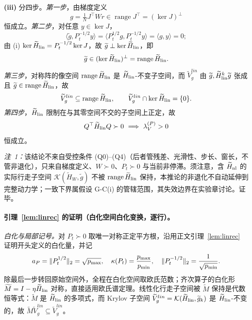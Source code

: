 \documentclass[fontset=windows,11pt]{ctexart}
\DeclarePairedDelimiter{\norm}{\lVert}{\rVert}
\newcommand{\W}{W}
\newcommand{\wt}[1]{\widetilde{#1}}
\numberwithin{equation}{section}
\begin{document}
\noindent\textbf{(iii)} 分四步。\emph{第一步}，由梯度定义
\begin{equation}
g=\tfrac1N J^\top\W r\in\operatorname{range}J^\top=(\ker J)^\perp
\end{equation}
恒成立。\emph{第二步}，对任意 $y\in\ker J$，
\begin{equation}
\langle\wt g,P_t^{-1/2}y\rangle
=\langle P_t^{1/2}g,P_t^{-1/2}y\rangle
=\langle g,y\rangle=0;
\end{equation}
由 (i) $\ker\wt H_{\rm lin}=P_t^{-1/2}\ker J$，故 $\wt g\perp\ker\wt H_{\rm lin}$，即
\begin{equation}
\wt g\in(\ker\wt H_{\rm lin})^\perp=\operatorname{range}\wt H_{\rm lin}.
\end{equation}
\emph{第三步}，对称阵的像空间 $\operatorname{range}\wt H_{\rm lin}$ 是 $\wt H_{\rm lin}$-不变子空间，而 $\wt V_g^{lin}$ 由 $\wt g,\wt H_{\rm lin}^k\wt g$ 张成且 $\wt g\in\operatorname{range}\wt H_{\rm lin}$，故
\begin{equation}
\wt V_g^{lin}\subseteq\operatorname{range}\wt H_{\rm lin},\qquad
\wt V_g^{lin}\cap\ker\wt H_{\rm lin}=\{0\}.
\end{equation}
\emph{第四步}，$\wt H_{\rm lin}$ 限制在与其零空间不交的子空间上正定，故
\begin{equation}
Q^\top\wt H_{\rm lin}Q\succ0\ \Longrightarrow\ \lambda_V^{(P)}>0
\end{equation}
恒成立。

\noindent\emph{注~1：}该结论不来自受控条件 (Q0)--(Q4)（后者管残差、光滑性、步长、窗长，不管非退化），只来自梯度定义、$\W\succ0$、$P_t\succ0$ 与当前非停滞。须注意，含 $\wt H_{\rm nl}$ 的实际行走子空间 $\mathcal K(\wt H_{\W},\wt g)$ 不被 $\operatorname{range}\wt H_{\rm lin}$ 保持，本推论的非退化不自动延伸到完整动力学；一致下界属假设 G-C(i) 的管辖范围，其失效边界在实验章讨论。证毕。

\paragraph{引理~\ref{lem:linrec} 的证明（白化空间白化变换，逐行）。}
\emph{白化与局部记号。}对 $P_t\succ0$ 取唯一对称正定平方根，沿用正文引理~\ref{lem:linrec} 证明开头定义的白化量，并记
\begin{equation}
a_P=\norm{P_t^{1/2}}_2=\sqrt{p_{\max}},\quad
\kappa(P_t)=\frac{p_{\max}}{p_{\min}},\quad
\norm{P_t^{-1/2}}_2=\frac1{\sqrt{p_{\min}}}.
\end{equation}
除最后一步转回原始空间外，全程在白化空间取欧氏范数；齐次算子的白化形 $\wt M=I-\eta\wt H_{\rm lin}$ 对称，直接适用欧氏谱定理。线性化行走子空间被 $\wt M$ 保持是代数恒等式：$\wt M$ 是 $\wt H_{\rm lin}$ 的多项式，而 Krylov 子空间 $\wt V_g^{lin}=\mathcal K(\wt H_{\rm lin},\wt g_k)$ 是 $\wt H_{\rm lin}$-不变的，故 $\wt M\wt V_g^{lin}\subseteq\wt V_g^{lin}$。
\end{document}
